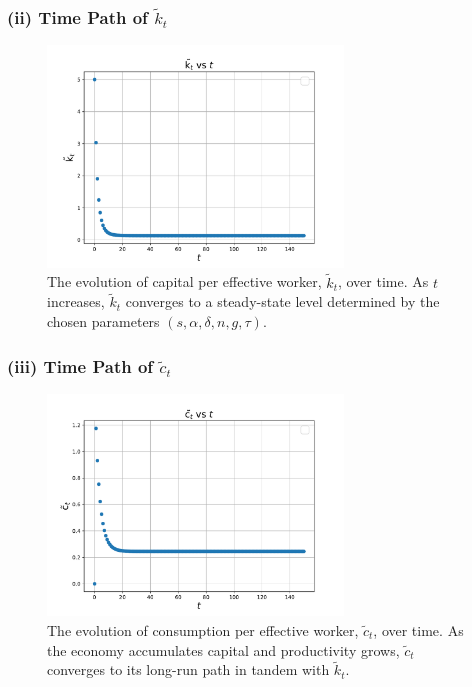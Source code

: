 \documentclass[12pt]{article}
\begin{document}
\subsubsection*{(ii) Time Path of $\widetilde{k}_t$}
\begin{figure}[H]
    \centering
    \includegraphics[width=0.7\textwidth]{4(f)(ii).pdf}
    \caption{The evolution of capital per effective worker, $\widetilde{k}_t$, over time. 
    As $t$ increases, $\widetilde{k}_t$ converges to a steady-state level determined 
    by the chosen parameters $(s, \alpha, \delta, n, g, \tau)$.}
    \label{fig:4(ii)}
\end{figure}

\subsubsection*{(iii) Time Path of $\widetilde{c}_t$}
\begin{figure}[H]
    \centering
    \includegraphics[width=0.7\textwidth]{4(f)(iii).pdf}
    \caption{The evolution of consumption per effective worker, $\widetilde{c}_t$, over time. 
    As the economy accumulates capital and productivity grows, $\widetilde{c}_t$ converges 
    to its long-run path in tandem with $\widetilde{k}_t$.}
    \label{fig:4(iii)}
\end{figure}
\end{document}
